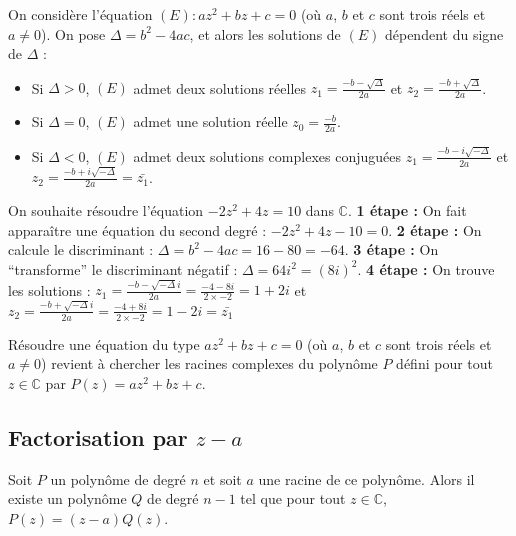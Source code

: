 	\begin{formula}
		On considère l'équation $(E) : az^2 + bz + c = 0$ (où $a$, $b$ et $c$ sont trois réels et $a \neq 0$). On pose $\Delta = b^2 - 4ac$, et alors les solutions de $(E)$ dépendent du signe de $\Delta$ :
		\begin{itemize}
			\item Si $\Delta > 0$, $(E)$ admet deux solutions réelles $z_1 = \frac{-b - \sqrt{\Delta}}{2a}$ et $z_2 = \frac{-b + \sqrt{\Delta}}{2a}$.
			\item Si $\Delta = 0$, $(E)$ admet une solution réelle $\displaystyle{z_0 = \frac{-b}{2a}}$.
			\item Si $\Delta < 0$, $(E)$ admet deux solutions complexes conjuguées $z_1 = \frac{-b - i\sqrt{-\Delta}}{2a}$ et $z_2 = \frac{-b + i\sqrt{-\Delta}}{2a} = \bar{z_1}$.
		\end{itemize}
	\end{formula}

	\begin{tip}[Exemple]
		On souhaite résoudre l'équation $-2z^2 + 4z = 10$ dans $\mathbb{C}$.
		\newpar
		\textbf{1\iere{} étape :} On fait apparaître une équation du second degré : $-2z^2 + 4z - 10 = 0$.
		\newpar
		\textbf{2\ieme{} étape :} On calcule le discriminant : $\Delta = b^2 - 4ac = 16 - 80 = -64$.
		\newpar
		\textbf{3\ieme{} étape :} On ``transforme'' le discriminant négatif : $\Delta = 64i^2 = (8i)^2$.
		\newpar
		\textbf{4\ieme{} étape :} On trouve les solutions :
		\newpar
		$z_1 = \frac{-b - \sqrt{-\Delta}i}{2a} = \frac{-4 - 8i}{2 \times -2} = 1 + 2i$ et $z_2 = \frac{-b + \sqrt{-\Delta}i}{2a} = \frac{-4 + 8i}{2 \times -2} = 1 - 2i = \bar{z_1}$
	\end{tip}

	\begin{tip}
		Résoudre une équation du type $az^2 + bz + c = 0$ (où $a$, $b$ et $c$ sont trois réels et $a \neq 0$) revient à chercher les racines complexes du polynôme $P$ défini pour tout $z \in \mathbb{C}$ par $P(z) = az^2 + bz + c$.
	\end{tip}

	\subsection{Factorisation par \texorpdfstring{$z-a$}{z-a}}

	\begin{formula}
		Soit $P$ un polynôme de degré $n$ et soit $a$ une racine de ce polynôme. Alors il existe un polynôme $Q$ de degré $n-1$ tel que pour tout $z \in \mathbb{C}$, $P(z) = (z-a)Q(z)$.
	\end{formula}

